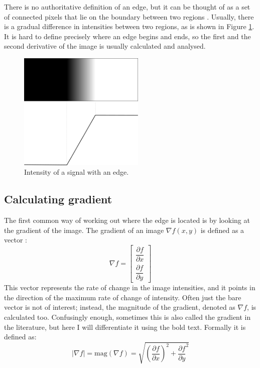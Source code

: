 \documentclass[
  digital,     %
  oneside,     %
  nosansbold,  %
  nocolorbold, %
  lof,         %
  lot,         %
]{fithesis4}
\begin{document}
There is no authoritative definition of an edge, but it can be thought of as a
set of connected pixels that lie on the boundary between two regions
\cite{gonzalez2002}. Usually, there is a gradual difference in intensities
between two regions, as is shown in Figure \ref{fig:edge_intensities}. It is
hard to define precisely where an edge begins and ends, so the first and the
second derivative of the image is usually calculated and analysed.


\begin{figure}
    \begin{center}
        \includegraphics[width=6cm]{resources/inkscape/gradient.png}
    \end{center}
    \caption{Intensity of a signal with an edge.}
    \label{fig:edge_intensities}
\end{figure}

\subsection{Calculating gradient}

The first common way of working out where the edge is located is by looking at
the gradient of the image. The gradient of an image $\nabla f(x,y)$ is defined
as a vector \cite{gonzalez2002}:
$$\nabla f =
\begin{bmatrix}
    \dfrac{\partial f}{\partial x}\\[2ex]
    \dfrac{\partial f}{\partial y}
\end{bmatrix}$$
This vector represents the rate of change in the image intensities, and it points in
the direction of the maximum rate of change of intensity. Often just the bare
vector is not of interest; instead, the magnitude of the gradient, denoted as
$\nabla f$, is calculated too. Confusingly enough, sometimes this is also called
the gradient in the literature, but here I will differentiate it using the bold
text. Formally it is defined as:
$$|\nabla f| = \text{mag}(\nabla f) = \sqrt{(\frac{\partial f}{\partial x})^2 +
\frac{\partial f}{\partial y}^2}$$
\end{document}
